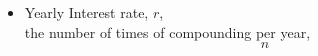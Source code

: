 \documentclass[preview]{standalone}
\begin{document}
\begin{center}
\begin{itemize} \item Yearly Interest rate, $r$, \\ the number of times of compounding per year, $$n$$ \\ \end{itemize}
\end{center}
\end{document}
